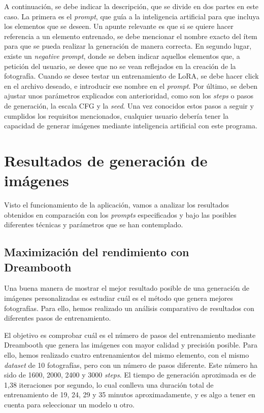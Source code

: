  A continuación, se debe indicar la descripción, que se divide en dos partes en este caso. La primera es el \textit{prompt}, que guía a la inteligencia artificial para que incluya los elementos que se deseen. Un apunte relevante es que si se quiere hacer referencia a un elemento entrenado, se debe mencionar el nombre exacto del ítem para que se pueda realizar la generación de manera correcta. En segundo lugar, existe un \textit{negative prompt}, donde se deben indicar aquellos elementos que, a petición del usuario, se desee que no se vean reflejados en la creación de la fotografía. Cuando se desee testar un entrenamiento de LoRA, se debe hacer click en el archivo deseado, e introducir ese nombre en el \textit{prompt}. Por último, se deben ajustar unos parámetros explicados con anterioridad, como son los \textit{steps} o pasos de generación, la escala CFG y la \textit{seed}. Una vez conocidos estos pasos a seguir y cumplidos los requisitos mencionados, cualquier usuario debería tener la capacidad de generar imágenes mediante inteligencia artificial con este programa.\\

\section{Resultados de generación de imágenes}

Visto el funcionamiento de la aplicación, vamos a analizar los resultados obtenidos en comparación con los \textit{prompts} especificados y bajo las posibles diferentes técnicas y parámetros que se han contemplado.


\subsection{Maximización del rendimiento con Dreambooth}

Una buena manera de mostrar el mejor resultado posible de una generación de imágenes personalizadas es estudiar cuál es el método que genera mejores fotografías. Para ello, hemos realizado un análisis comparativo de resultados con diferentes pasos de entrenamiento.

El objetivo es comprobar cuál es el número de pasos del entrenamiento mediante Dreambooth que genera las imágenes con mayor calidad y precisión posible. Para ello, hemos realizado cuatro entrenamientos del mismo elemento, con el mismo \textit{dataset} de 10 fotografías, pero con un número de pasos diferente. Este número ha sido de 1600, 2000, 2400 y 3000 \textit{steps}. El tiempo de generación aproximada es de 1,38 iteraciones por segundo, lo cual conlleva una duración total de entrenamiento de 19, 24, 29 y 35 minutos aproximadamente, y es algo a tener en cuenta para seleccionar un modelo u otro.\\

